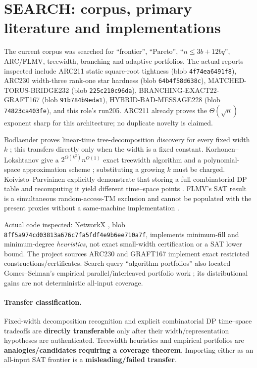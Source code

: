 \documentclass[11pt]{article}
\begin{document}
\section{SEARCH: corpus, primary literature and implementations}
The current corpus was searched for ``frontier'', ``Pareto'',
``$n\le3b+12bq$'', ARC/FLMV, treewidth, branching and adaptive portfolios.
The actual reports inspected include ARC211 static square-root tightness (blob
\texttt{4f74ea6491f8}), ARC230 width-three rank-one star hardness (blob
\texttt{64b4f58d638c}), MATCHED-TORUS-BRIDGE232 (blob
\texttt{225c210c96da}), BRANCHING-EXACT22-GRAFT167 (blob
\texttt{91b784b9eda1}), HYBRID-BAD-MESSAGE228 (blob
\texttt{74823ca403fe}), and this role's run205.  ARC211 already proves the
$\Theta(\sqrt n)$ exponent sharp for this architecture; no duplicate novelty
is claimed.

Bodlaender proves linear-time tree-decomposition discovery for every fixed
width $k$ \cite{Bodlaender}; this transfers directly only when the width is a
fixed constant.  Korhonen--Lokshtanov give a
$2^{O(k^2)}n^{O(1)}$ exact treewidth algorithm and a polynomial-space
approximation scheme \cite{KL}; substituting a growing $k$ must be charged.
Koivisto--Parviainen explicitly demonstrate that storing a full combinatorial
DP table and recomputing it yield different time--space points \cite{KP}.
FLMV's SAT result is a simultaneous random-access-TM exclusion and cannot be
populated with the present proxies without a same-machine implementation
\cite{FLMV}.

Actual code inspected: NetworkX
, blob
\texttt{8ff5a974cd03813a676c7fa5fdf4e9b6ee710a7f}, implements minimum-fill and
minimum-degree \emph{heuristics}, not exact small-width certification or a
SAT lower bound.  The project sources ARC230 and GRAFT167 implement exact
restricted constructions/certificates.  Search query ``algorithm portfolios''
also located Gomes--Selman's empirical parallel/interleaved portfolio work
\cite{GS}; its distributional gains are not deterministic all-input coverage.

\paragraph{Transfer classification.}
Fixed-width decomposition recognition and explicit combinatorial DP
time--space tradeoffs are \textbf{directly transferable} only after their
width/representation hypotheses are authenticated.  Treewidth heuristics and
empirical portfolios are \textbf{analogies/candidates requiring a coverage
theorem}.  Importing either as an all-input SAT frontier is a
\textbf{misleading/failed transfer}.
\end{document}
